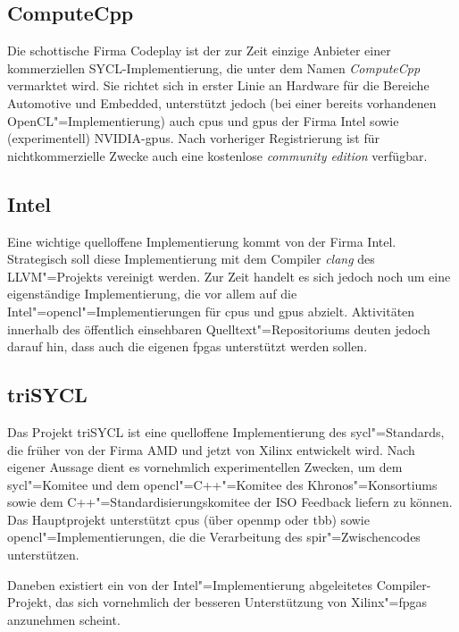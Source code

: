 \subsection{ComputeCpp}

Die schottische Firma Codeplay ist der zur Zeit einzige Anbieter einer
kommerziellen SYCL-Implementierung, die unter dem Namen \textit{ComputeCpp}
vermarktet wird. Sie richtet sich in erster Linie an Hardware für die Bereiche
Automotive und Embedded, unterstützt jedoch (bei einer bereits vorhandenen
OpenCL"=Implementierung) auch \gls{cpu}s und \gls{gpu}s der Firma Intel sowie
(experimentell) NVIDIA-\gls{gpu}s. Nach vorheriger Registrierung ist für
nichtkommerzielle Zwecke auch eine kostenlose \textit{community edition}
verfügbar. \cite[vgl.][]{computecpp}

\subsection{Intel}

Eine wichtige quelloffene Implementierung kommt von der Firma Intel. Strategisch
soll diese Implementierung mit dem Compiler \textit{clang} des LLVM"=Projekts
vereinigt werden. Zur Zeit handelt es sich jedoch noch um eine eigenständige
Implementierung, die vor allem auf die Intel"=\gls{opencl}"=Implementierungen
für \gls{cpu}s und \gls{gpu}s abzielt. Aktivitäten innerhalb des öffentlich
einsehbaren Quelltext"=Repositoriums deuten jedoch darauf hin, dass auch die
eigenen \gls{fpga}s unterstützt werden sollen. \cite[vgl.][]{intelsycl}

\subsection{triSYCL}

Das Projekt triSYCL ist eine quelloffene Implementierung des
\gls{sycl}"=Standards, die früher von der Firma AMD und jetzt von Xilinx
entwickelt wird. Nach eigener Aussage dient es vornehmlich experimentellen
Zwecken, um dem \gls{sycl}"=Komitee und dem \gls{opencl}"=C++"=Komitee des
Khronos"=Konsortiums sowie dem C++"=Standardisierungskomitee der ISO Feedback
liefern zu können. Das Hauptprojekt unterstützt \gls{cpu}s (über \gls{openmp}
oder \gls{tbb}) sowie \gls{opencl}"=Implementierungen, die die Verarbeitung des
\gls{spir}"=Zwischencodes unterstützen. \cite[vgl.][]{trisycl}

Daneben existiert ein von der Intel"=Implementierung abgeleitetes
Compiler-Projekt, das sich vornehmlich der besseren Unterstützung von
Xilinx"=\gls{fpga}s anzunehmen scheint. \cite[vgl.][]{trisyclclang}

